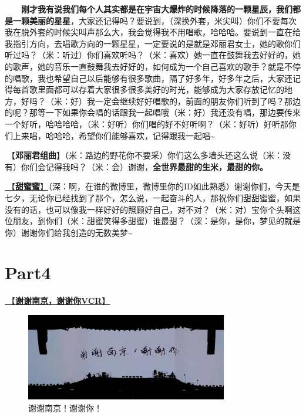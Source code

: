 \documentclass[]{ctexbook}
\begin{document}
  \textbf{刚才我有说我们每个人其实都是在宇宙大爆炸的时候降落的一颗星辰，我们都是一颗美丽的星星}，大家还记得吗？要说到，（深换外套，米尖叫）你们不要每次我在脱外套的时候尖叫声那么大，我会觉得我不用唱歌，哈哈哈。要说到一直在给我指引方向，去唱歌方向的一颗星星，一定要说的是就是邓丽君女士，她的歌你们听过吗？（米：听过）你们喜欢听吗？（米：喜欢）她一直在鼓舞我去好好的，她的歌声，她的音乐一直鼓舞我去好好的，如何成为一个自己喜欢的歌手？就是不停的唱歌，我也希望自己以后能够有很多歌曲，隔了好多年，好多年之后，大家还记得每首歌里面都可以存着大家很多很多美好的时光，能够成为大家存放记忆的地方，好吗？（米：好）我一定会继续好好唱歌的，前面的朋友你们听到了吗？那边的呢？那等一下如果你会唱的话跟我一起唱哦（米：好）我还没有唱，那边要传来一个好听，哈哈哈哈，（米：好听）你们唱的好不好听啊？（米：好听）好听那你们上来唱，哈哈哈，希望你们能够喜欢，记得跟我一起唱\textasciitilde{}

🎵【\textbf{邓丽君组曲}】（米：路边的野花你不要采）你们这么多墙头还这么说（米：没有）你们会记得我吗？（米：会）谢谢，\textbf{全世界最甜的生米，最甜的你。}

\hyperref[sweet]{🎵【\textbf{甜蜜蜜}】}（深：啊，在谁的微博里，微博里你的ID如此熟悉）谢谢你们，今天是七夕，无论你已经找到了那个，怎么说，一起奋斗的人，那祝你们甜甜蜜蜜，如果没有的话，也可以像我一样好好的照顾好自己，对不对？（米：对）宝你个头啊这位朋友，到你们（米：甜蜜笑得多甜蜜）谁最甜？（深：是你，是你，梦见的就是你）谢谢你们给我创造的无数美梦\textasciitilde{}

\section{Part4}\label{nanjing-20240810-part4}

\hyperref[thank-you-vcr]{🎥【\textbf{谢谢南京，谢谢你VCR}】}

\begin{figure}

{\centering \includegraphics[width=250pt]{img/nanjing20240810/thank-nanjing} 

}

\caption{谢谢南京！谢谢你！}\label{fig:unnamed-chunk-65}
\end{figure}
\end{document}
